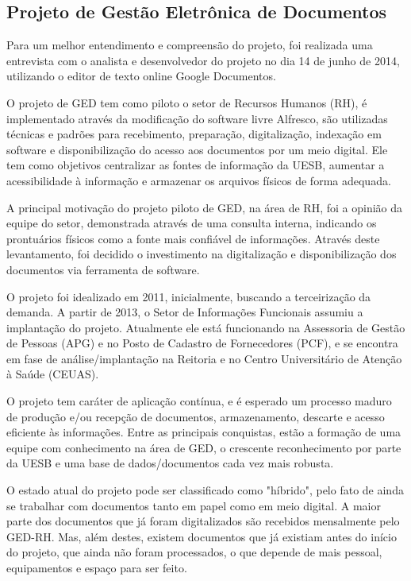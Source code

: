 \subsection{Projeto de Gestão Eletrônica de Documentos}

Para um melhor entendimento e compreensão do projeto, foi realizada uma entrevista com o analista e desenvolvedor do projeto no dia 14 de junho de 2014, utilizando o editor de texto online Google Documentos.

O projeto de GED tem como piloto o setor de Recursos Humanos (RH), é implementado através da modificação do software livre Alfresco, são utilizadas técnicas e padrões para recebimento, preparação, digitalização, indexação em software e disponibilização do acesso aos documentos por um meio digital. Ele tem como objetivos centralizar as fontes de informação da UESB, aumentar a acessibilidade à informação e armazenar os arquivos físicos de forma adequada.

A principal motivação do projeto piloto de GED, na área de RH, foi a opinião da equipe do setor, demonstrada através de uma consulta interna, indicando os prontuários físicos como a fonte mais confiável de informações. Através deste levantamento, foi decidido o investimento na digitalização e disponibilização dos documentos via ferramenta de software.

O projeto foi idealizado em 2011, inicialmente, buscando a terceirização da demanda. A partir de 2013, o Setor de Informações Funcionais assumiu a implantação do projeto. Atualmente ele está funcionando na Assessoria de Gestão de Pessoas (APG) e no Posto de Cadastro de Fornecedores (PCF), e se encontra em fase de análise/implantação na Reitoria e no Centro Universitário de Atenção à Saúde (CEUAS). 

O projeto tem caráter de aplicação contínua, e é esperado um processo maduro de produção e/ou recepção de documentos, armazenamento, descarte e acesso eficiente às informações. Entre as principais conquistas, estão a formação de uma equipe com conhecimento na área de GED, o crescente reconhecimento por parte da UESB e uma base de dados/documentos cada vez mais robusta. 

O estado atual do projeto pode ser classificado como "híbrido", pelo fato de ainda se trabalhar com documentos tanto em papel como em meio digital. A maior parte dos documentos que já foram digitalizados são recebidos mensalmente pelo GED-RH. Mas, além destes, existem documentos que já existiam antes do início do projeto, que ainda não foram processados, o que depende de mais pessoal, equipamentos e espaço para ser feito.

